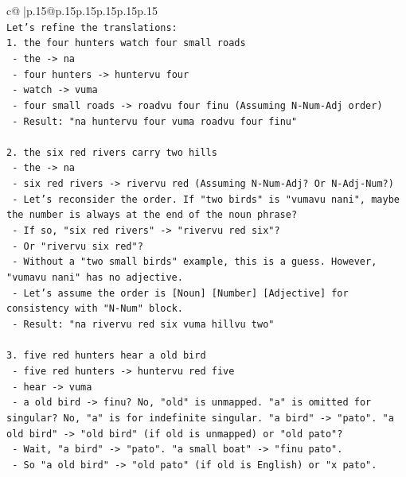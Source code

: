 \documentclass{article}
\begin{document}
{\begin{supertabular}{c@{$\;$}|p{.15\linewidth}@{}p{.15\linewidth}p{.15\linewidth}p{.15\linewidth}p{.15\linewidth}p{.15\linewidth}}
{{{\\ 
\texttt{Let's refine the translations:} \\
\texttt{1. the four hunters watch four small roads} \\
\texttt{   {-} the {-}> na} \\
\texttt{   {-} four hunters {-}> huntervu four} \\
\texttt{   {-} watch {-}> vuma} \\
\texttt{   {-} four small roads {-}> roadvu four finu (Assuming N{-}Num{-}Adj order)} \\
\texttt{   {-} Result: "na huntervu four vuma roadvu four finu"} \\
\\ 
\texttt{2. the six red rivers carry two hills} \\
\texttt{   {-} the {-}> na} \\
\texttt{   {-} six red rivers {-}> rivervu red (Assuming N{-}Num{-}Adj? Or N{-}Adj{-}Num?)} \\
\texttt{   {-} Let's reconsider the order. If "two birds" is "vumavu nani", maybe the number is always at the end of the noun phrase?} \\
\texttt{   {-} If so, "six red rivers" {-}> "rivervu red six"?} \\
\texttt{   {-} Or "rivervu six red"?} \\
\texttt{   {-} Without a "two small birds" example, this is a guess. However, "vumavu nani" has no adjective.} \\
\texttt{   {-} Let's assume the order is {[}Noun{]} {[}Number{]} {[}Adjective{]} for consistency with "N{-}Num" block.} \\
\texttt{   {-} Result: "na rivervu red six vuma hillvu two"} \\
\\ 
\texttt{3. five red hunters hear a old bird} \\
\texttt{   {-} five red hunters {-}> huntervu red five} \\
\texttt{   {-} hear {-}> vuma} \\
\texttt{   {-} a old bird {-}> finu? No, "old" is unmapped. "a" is omitted for singular? No, "a" is for indefinite singular. "a bird" {-}> "pato". "a old bird" {-}> "old bird" (if old is unmapped) or "old pato"?} \\
\texttt{   {-} Wait, "a bird" {-}> "pato". "a small boat" {-}> "finu pato".} \\
\texttt{   {-} So "a old bird" {-}> "old pato" (if old is English) or "x pato".} \\
}}}
\end{supertabular}}
\end{document}
